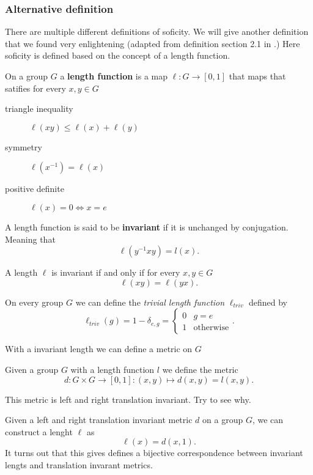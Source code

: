 	\subsubsection{Alternative definition}
	There are multiple different definitions of soficity. 
	We will give another definition that we found very enlightening (adapted from definition section 2.1 in \cite{capraro_lupini_2015}.)
	Here soficity is defined based on the concept of a length function.
	\begin{definition}
		On a group $G$ a \textbf{length function} is a map $\ell: G \to [0,1]$ that maps that satifies for every  $x, y \in G$
		\begin{description}
			\item[triangle inequality] $\ell(xy) \le \ell(x) + \ell(y)$
			\item[symmetry]  $\ell(x^{-1}) = \ell(x)$
			\item[positive definite] $\ell(x) = 0 \iff x = e$
		\end{description}
		A length function is said to be \textbf{invariant} if it is unchanged by conjugation. Meaning that \[
			\ell(y^{-1}xy) = l(x)
		.\] 
	\end{definition}
	\begin{remark}
		A length $\ell$ is invariant if and only if for every $x, y \in G$ \[
			\ell(xy) = \ell(yx)
		.\] 
	\end{remark}
    \begin{example}
    On every group $G$ we can define the \emph{trivial length function} $\ell_{triv}$ defined by
    \[
    \ell_{triv}(g) = 1 - \delta_{e,g}= \begin{cases}  0 & g= e \\
                                                    1 & \text{otherwise}
                                        \end{cases}.
    \]
    \end{example}
	
	With a invariant length we can define a metric on $G$
	 \begin{definition}
	 Given a group $G$ with a length function $l$ we define the metric \[d: G\times G \to [0,1]: (x,y) \mapsto d(x,y) = l(x,y). \]
	\end{definition}
	\begin{remark}
		This metric is left and right translation invariant. Try to see why.
	\end{remark}
	\begin{remark}
		Given a left and right translation invariant metric $d$ on a group  $G$, we can construct a lenght  $\ell$ as  \[
			\ell(x) = d(x, 1)
		.\] 
		It turns out that this gives defines a bijective correspondence between invariant lengts and translation invarant metrics. 
	\end{remark}
	
